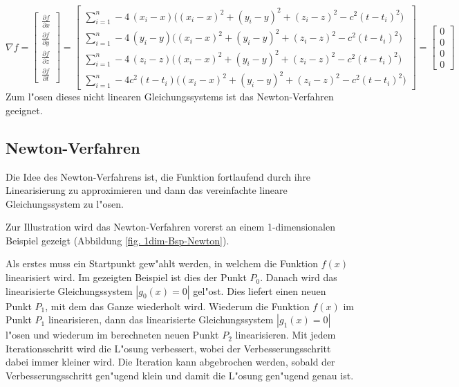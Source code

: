 \begin{refsection}
\[
\nabla f
=
\begin{bmatrix}
\frac{\partial f}{\partial x}\\
\frac{\partial f}{\partial y}\\
\frac{\partial f}{\partial z}\\
\frac{\partial f}{\partial t}
\end{bmatrix}
=
\begin{bmatrix}
\sum\limits_{i=1}^{n}-4\,(x_i-x)\bigl((x_i - x)^2 + (y_i - y)^2 + (z_i - z)^2 - c^2(t - t_i)^2 \bigr)\\
\sum\limits_{i=1}^{n}-4\,(y_i-y)\bigl((x_i - x)^2 + (y_i - y)^2 + (z_i - z)^2 - c^2(t - t_i)^2 \bigr)\\
\sum\limits_{i=1}^{n}-4\,(z_i-z)\bigl((x_i - x)^2 + (y_i - y)^2 + (z_i - z)^2 - c^2(t - t_i)^2 \bigr)\\
\sum\limits_{i=1}^{n}-4 c^2(t-t_i)\bigl((x_i - x)^2 + (y_i - y)^2 + (z_i - z)^2 - c^2(t - t_i)^2\bigr)
\end{bmatrix}
=
\begin{bmatrix} 0 \\ 0 \\ 0 \\ 0 \end{bmatrix}
\]
		Zum l"osen dieses nicht linearen Gleichungssystems ist das Newton-Verfahren geeignet.

\subsection{Newton-Verfahren}
Die Idee des Newton-Verfahrens ist, die Funktion fortlaufend durch
ihre Linearisierung zu approximieren und dann das vereinfachte lineare
Gleichungssystem zu l"osen.

Zur Illustration wird das Newton-Verfahren vorerst
an einem 1-dimensionalen Beispiel gezeigt (Abbildung
\ref{fig. 1dim-Bsp-Newton}).

Als erstes muss ein Startpunkt gew"ahlt werden, in welchem die
Funktion $f(x)$ linearisiert wird. Im gezeigten Beispiel ist dies
der Punkt $P_0$. Danach wird das linearisierte Gleichungssystem
$|g_0(x)=0|$ gel"ost. Dies liefert einen neuen Punkt $P_1$, mit
dem das Ganze wiederholt wird. Wiederum die Funktion $f(x)$ im
Punkt $P_1$ linearisieren, dann das linearisierte Gleichungssystem
$|g_1(x)=0|$ l"osen und wiederum im berechneten neuen Punkt $P_2$
linearisieren. Mit jedem Iterationsschritt wird die L"osung verbessert,
wobei der Verbesserungsschritt dabei immer kleiner wird. Die Iteration
kann abgebrochen werden, sobald der Verbesserungsschritt gen"ugend klein
und damit die L"osung gen"ugend genau ist.


\end{refsection}
